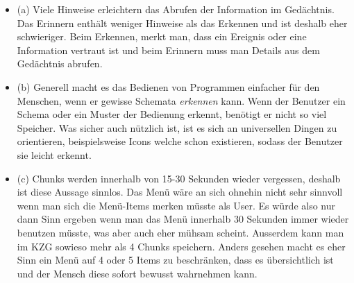 
\begin{itemize}

    \item (a) Viele Hinweise erleichtern das Abrufen der Information im Gedächtnis.
Das Erinnern enthält weniger Hinweise als das Erkennen und ist deshalb
eher schwieriger. Beim Erkennen, merkt man, dass ein Ereignis
oder eine Information vertraut ist und beim Erinnern muss man Details
aus dem Gedächtnis abrufen. 
    
    \item (b) Generell macht es das Bedienen von Programmen einfacher für den Menschen, wenn er 
    gewisse Schemata \textit{erkennen} kann. Wenn der Benutzer ein Schema oder ein Muster der Bedienung
    erkennt, benötigt er nicht so viel Speicher. Was sicher auch nützlich ist, ist es sich an universellen 
    Dingen zu orientieren, beispielsweise Icons welche schon existieren, sodass der Benutzer sie leicht erkennt.
    
    \item (c) Chunks werden innerhalb von 15-30 Sekunden wieder vergessen, deshalb ist diese Aussage 
    sinnlos. Das Menü wäre an sich ohnehin nicht sehr sinnvoll wenn man sich die Menü-Items merken müsste als User.
    Es würde also nur dann Sinn ergeben wenn man das Menü innerhalb 30 Sekunden immer wieder benutzen müsste,
    was aber auch eher mühsam scheint. Ausserdem kann man im KZG sowieso mehr als 4 Chunks speichern.
    Anders gesehen macht es eher Sinn ein Menü auf 4 oder 5 Items zu beschränken, dass es übersichtlich ist und 
    der Mensch diese sofort bewusst wahrnehmen kann. 
    
\end{itemize}


